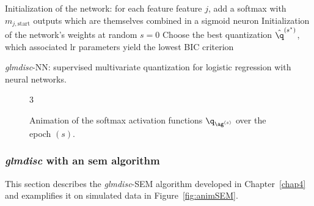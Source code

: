 \begin{algorithm}[H]
 Initialization of the network: for each feature feature $j$, add a softmax with $m_{j,\text{start}}$ outputs which are themselves combined in a sigmoid neuron\;
 Initialization of the network's weights at random\;
 $s = 0$\;
 Choose the best quantization $\hat{\q}^{(s^\star)}$, which associated \gls{lr} parameters yield the lowest BIC criterion\;
 \caption{\label{NN-disc} \textit{glmdisc}-NN: supervised multivariate quantization for logistic regression with neural networks.}
\end{algorithm}

\begin{figure}[!h]
\begin{animateinline}[poster=first, controls=all, palindrome, autopause, autoresume, width=\textwidth, height=6cm]{3}
%
\end{animateinline}
\caption{\label{fig:animNN} Animation of the softmax activation functions $\q_{\ag^{(s)}}$ over the epoch $(s)$.}
\end{figure}



\subsubsection{\textit{glmdisc} with an \gls{sem} algorithm} \label{app1:glmdiscSEM}

This section describes the \textit{glmdisc}-SEM algorithm developed in Chapter~\ref{chap4} and examplifies it on simulated data in Figure~\ref{fig:animSEM}.

